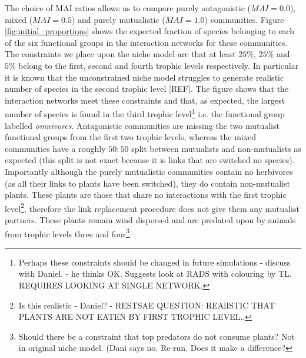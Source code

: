 \begin{itemize}
The choice of MAI ratios allows us to compare purely antagonistic ($MAI=0.0$), mixed ($MAI=0.5$) and purely mutualistic ($MAI=1.0$) communities. Figure \ref{fig:initial_proportions} shows the expected fraction of species belonging to each of the six functional groups in the interaction networks for these communities. The constraints we place upon the niche model are that at least $25\%$, $25\%$ and $5\%$ belong to the first, second and fourth trophic levels respectively. In particular it is known that the unconstrained niche model struggles to generate realistic number of species in the second trophic level [REF]. The figure shows that the interaction networks meet these constraints and that, as expected, the largest number of species is found in the third trophic level\footnote{Perhaps these constraints should be changed in future simulations - discuss with Daniel. - he thinks OK. Suggests look at RADS with colouring by TL. REQUIRES LOOKING AT SINGLE NETWORK.} i.e. the functional group labelled \emph{omnivores}. Antagonistic communities are missing the two mutualist functional groups from the first two trophic levels, whereas the mixed communities have a roughly $50:50$ split between mutualists and non-mutualists as expected (this split is not exact because it is links that are switched no species). Importantly although the purely mutualistic communities contain no herbivores (as all their links to plants have been switched), they do contain non-mutualist plants. These plants are those that share no interactions with the first trophic level\footnote{Is this realistic - Daniel? - RESTSAE QUESTION: REAlISTIC THAT PLANTS ARE NOT EATEN BY FIRST TROPHIC LEVEL..}, therefore the link replacement procedure does not give them any mutualist partners. These plants remain wind dispersed and are predated upon by animals from trophic levels three and four\footnote{Should there be a constraint that top predators do not consume plants? Not in original niche model. (Dani says no. Re-run. Does it make a difference?}.   

\clearpage
\thispagestyle{empty}
\begin{figure}

		\centering      
		\hspace{-3cm}


\end{figure}
\end{itemize}
